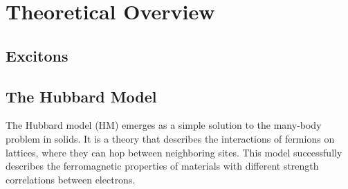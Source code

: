 
\chapter{Theoretical Overview}
\label{sec:theory}

\section{Excitons}




\section{The Hubbard Model}

The Hubbard model (HM) emerges as a simple solution to the many-body problem in solids. It is a theory that describes the interactions of fermions on lattices, where they can hop between neighboring sites. This model successfully describes the ferromagnetic properties of materials with different strength correlations between electrons. %

